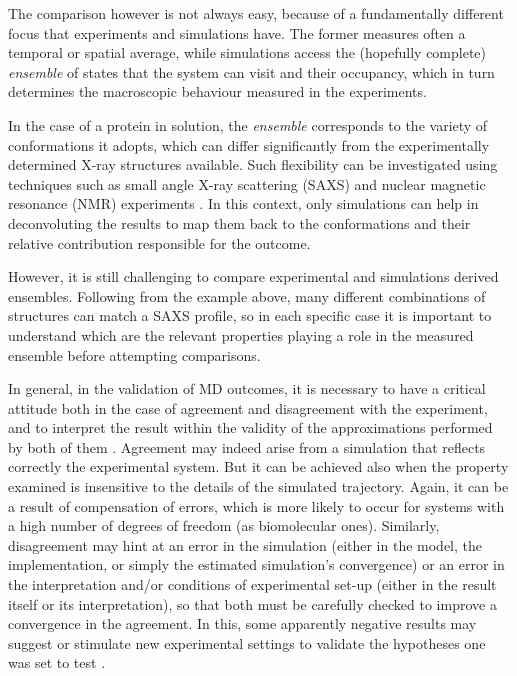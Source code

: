 The comparison however is not always easy, because of a fundamentally different focus that experiments and simulations have.
%
The former measures often a temporal or spatial average, while simulations access the (hopefully complete) \emph{ensemble} of states that the system can visit and their occupancy, which in turn determines the macroscopic behaviour measured in the experiments.

In the case of a protein in solution, the \emph{ensemble} corresponds to the variety of conformations it adopts, which can differ significantly from the experimentally determined X-ray structures available. Such flexibility can be investigated using techniques such as small angle X-ray scattering (SAXS) and nuclear magnetic resonance (NMR) experiments \citep{Bonomi2017,Kikhney2015,Kleckner2011}. In this context, only simulations can help in deconvoluting the results to map them back to the conformations and their relative contribution responsible for the outcome.

However, it is still challenging to compare experimental and simulations derived ensembles. Following from the example above, many different combinations of structures can match a SAXS profile, so in each specific case it is important to understand which are the relevant properties playing a role in the measured ensemble before attempting comparisons.

In general, in the validation of MD outcomes, it is necessary to have a critical attitude both in the case of agreement and disagreement with the experiment, and to interpret the result within the validity of the approximations performed by both of them \citep{VanGunsteren2008}.
%
Agreement may indeed arise from a simulation that reflects correctly the experimental system. But it can be achieved also when the property examined is insensitive to the details of the simulated trajectory. Again, it can be a result of compensation of errors, which is more likely to occur for systems with a high number of degrees of freedom (as biomolecular ones).
%
Similarly, disagreement may hint at an error in the simulation (either in the model, the implementation, or simply the estimated simulation's convergence) or an error in the interpretation and/or conditions of experimental set-up (either in the result itself or its interpretation), so that both must be carefully checked to improve a convergence in the agreement.
%
In this, some apparently negative results may suggest or stimulate new experimental settings to validate the hypotheses one was set to test \citep{Goncalves2013,Meissner2014}.

